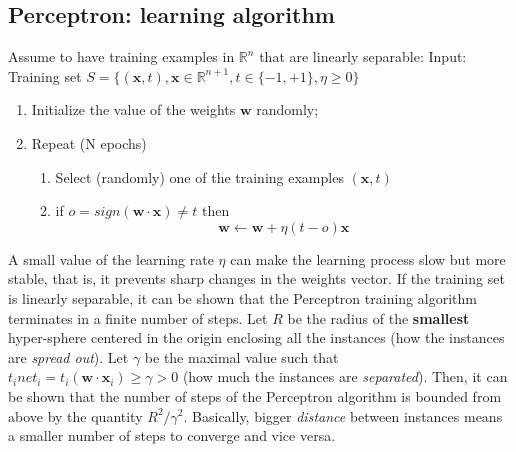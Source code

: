 \subsection{Perceptron: learning algorithm}
Assume to have training examples in $\mathbb{R}^{n}$ that are linearly separable:\newline\newline
Input: Training set $S = \{(\textbf{x}, t), \textbf{x} \in \mathbb{R}^{n+1}, t \in \{-1, +1\}, \eta \geq 0\}$
\begin{enumerate}
    \item Initialize the value of the weights $\textbf{w}$ randomly;
    \item Repeat (N epochs)
    \begin{enumerate}
        \item Select (randomly) one of the training examples $(\textbf{x}, t)$
        \item if $o = sign(\textbf{w} \cdot \textbf{x}) \neq t$ then
        \[\textbf{w} \leftarrow \textbf{w} + \eta(t-o)\textbf{x}\]
    \end{enumerate}
\end{enumerate}
A small value of the learning rate $\eta$ can make the learning process slow but more stable, that is, it prevents sharp changes in the weights vector. If the training set is linearly separable, it can be shown that the Perceptron training algorithm terminates in a finite number of steps.\newline\newline
Let $R$ be the radius of the \textbf{smallest} hyper-sphere centered in the origin enclosing all the instances (how the instances are \textit{spread out}). Let $\gamma$ be the maximal value such that $t_{i}net_{i} = t_{i}(\textbf{w} \cdot \textbf{x}_{i}) \geq \gamma > 0$ (how much the instances are \textit{separated}). Then, it can be shown that the number of steps of the Perceptron algorithm is bounded from above by the quantity $R^{2}/\gamma^{2}$. Basically, bigger \textit{distance} between instances means a smaller number of steps to converge and vice versa.

